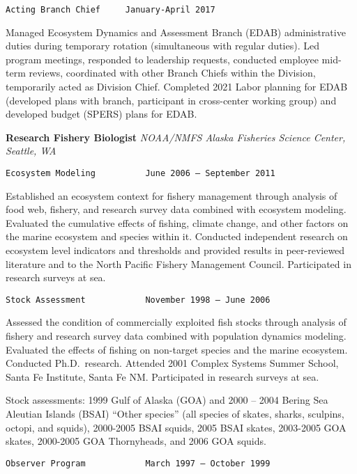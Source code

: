 \documentclass[11pt, a4paper]{awesome-cv}
\begin{document}
\begin{verbatim}
Acting Branch Chief     January-April 2017  
\end{verbatim}

Managed Ecosystem Dynamics and Assessment Branch (EDAB) administrative
duties during temporary rotation (simultaneous with regular duties). Led
program meetings, responded to leadership requests, conducted employee
mid-term reviews, coordinated with other Branch Chiefs within the
Division, temporarily acted as Division Chief. Completed 2021 Labor
planning for EDAB (developed plans with branch, participant in
cross-center working group) and developed budget (SPERS) plans for EDAB.

\textbf{Research Fishery Biologist} \emph{NOAA/NMFS Alaska Fisheries
Science Center, Seattle, WA}

\begin{verbatim}
Ecosystem Modeling          June 2006 – September 2011
\end{verbatim}

Established an ecosystem context for fishery management through analysis
of food web, fishery, and research survey data combined with ecosystem
modeling. Evaluated the cumulative effects of fishing, climate change,
and other factors on the marine ecosystem and species within it.
Conducted independent research on ecosystem level indicators and
thresholds and provided results in peer-reviewed literature and to the
North Pacific Fishery Management Council. Participated in research
surveys at sea.

\begin{verbatim}
Stock Assessment            November 1998 – June 2006
\end{verbatim}

Assessed the condition of commercially exploited fish stocks through
analysis of fishery and research survey data combined with population
dynamics modeling. Evaluated the effects of fishing on non-target
species and the marine ecosystem. Conducted Ph.D.~research. Attended
2001 Complex Systems Summer School, Santa Fe Institute, Santa Fe NM.
Participated in research surveys at sea.

Stock assessments: 1999 Gulf of Alaska (GOA) and 2000 -- 2004 Bering Sea
Aleutian Islands (BSAI) ``Other species'' (all species of skates,
sharks, sculpins, octopi, and squids), 2000-2005 BSAI squids, 2005 BSAI
skates, 2003-2005 GOA skates, 2000-2005 GOA Thornyheads, and 2006 GOA
squids.

\begin{verbatim}
Observer Program            March 1997 – October 1999
\end{verbatim}
\end{document}
